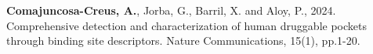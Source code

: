 \textbf{Comajuncosa-Creus, A.}, Jorba, G., Barril, X. and Aloy, P., 2024. Comprehensive detection and characterization of human druggable pockets through binding site descriptors. Nature Communications, 15(1), pp.1-20.








\newpage

\fancyhead[RO]{\small\nouppercase{\leftmark}} %
